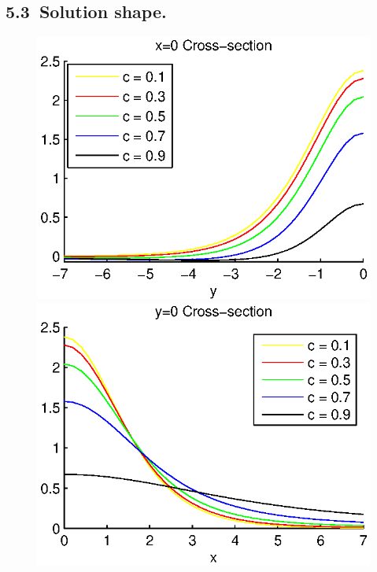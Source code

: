 \documentclass[leqno,11pt]{book}
\begin{document}
\subsection{5.3~Solution shape.}

\begin{figure}[ht]
	\begin{minipage}[b]{0.5\linewidth}
		\raggedleft
		\includegraphics[width=\linewidth]{cross-sections/c=01__09beta=1x=0.eps}
	\end{minipage}	
	\begin{minipage}[b]{0.5\linewidth}
		\raggedright
		 \includegraphics[width=\linewidth]{cross-sections/c=01__09beta=1y=0.eps}

\end{minipage}
\end{figure}
\end{document}
